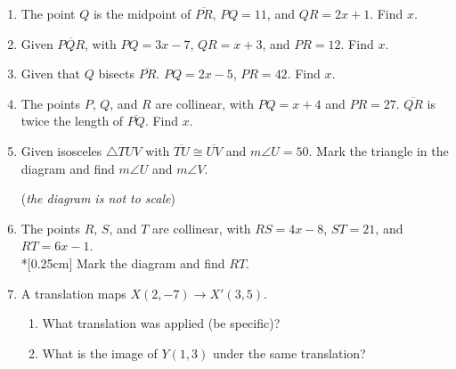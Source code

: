 \documentclass[12pt, twoside]{article}
\begin{document}
\begin{enumerate}
  \item The point $Q$ is the midpoint of $\overline{PR}$, $PQ=11$, and $QR=2x+1$. Find ${x}$.
  \vspace{4cm}
  
  \item Given $\overline{PQR}$, with $PQ=3x-7$, $QR=x+3$, and $PR=12$. Find ${x}$.
  \vspace{4cm}
  
  \item Given that $Q$ bisects $\overline{PR}$. $PQ=2x-5$, $PR=42$. Find ${x}$.
  \vspace{4cm}
  
  \item The points $P$, $Q$, and $R$ are collinear, with $PQ=x+4$ and $PR=27$. $\overline{QR}$ is twice the length of $\overline{PQ}$. Find ${x}$.
  
  

\newpage
    \item Given isosceles $\triangle TUV$ with $\overline{TU} \cong \overline{UV}$ and $m\angle U = 50$. Mark the triangle in the diagram and find $m\angle U$ and $m\angle V$.
  \begin{flushright}
    (\emph{the diagram is not to scale})\\
  \end{flushright}

  \item The points $R$, $S$, and $T$ are collinear, with $RS=4x-8$, $ST=21$, and $RT=6x-1$. \\*[0.25cm]
  Mark the diagram and find ${RT}$. \vspace{0.5cm}
  \begin{flushright}
    \end{flushright} \vspace{4cm}

  \item A translation maps $X(2,-7) \rightarrow X'(3,5)$. 
    \begin{enumerate}
      \item What translation was applied (be specific)?  \vspace{2cm}
      \item What is the image of $Y(1,3)$ under the same translation?
      \end{enumerate} \vspace{2cm}
  

\end{enumerate}
\end{document}
